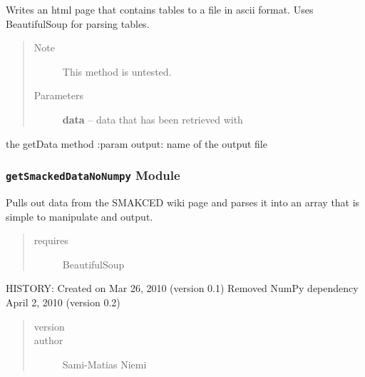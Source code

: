 \documentclass[letterpaper,10pt,english]{sphinxmanual}
\begin{document}
\begin{fulllineitems}
\begin{fulllineitems}
\label{SamPy.smakced:SamPy.smakced.getSmackedData.Smakced.writeToFile}
Writes an html page that contains tables to a file
in ascii format.
Uses BeautifulSoup for parsing tables.
\begin{quote}\begin{description}
\item[{Note }] \leavevmode
This method is untested.

\item[{Parameters}] \leavevmode
\textbf{data} -- data that has been retrieved with

\end{description}\end{quote}

the getData method
:param output: name of the output file

\end{fulllineitems}


\end{fulllineitems}



\subsubsection{\texttt{getSmackedDataNoNumpy} Module}
\label{SamPy.smakced:getsmackeddatanonumpy-module}\label{SamPy.smakced:module-SamPy.smakced.getSmackedDataNoNumpy}
Pulls out data from the SMAKCED wiki page
and parses it into an array that is simple
to manipulate and output.
\begin{quote}\begin{description}
\item[{requires}] \leavevmode
BeautifulSoup

\end{description}\end{quote}

HISTORY:
Created on Mar 26, 2010 (version 0.1)
Removed NumPy dependency April 2, 2010 (version 0.2)
\begin{quote}\begin{description}
\item[{version}] 

\item[{author}] \leavevmode
Sami-Matias Niemi

\end{description}\end{quote}
\end{document}
